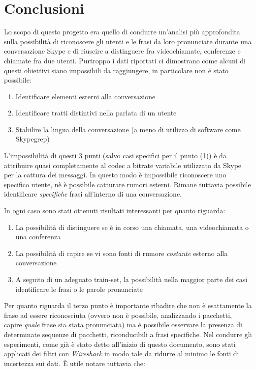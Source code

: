 \chapter{Conclusioni}

Lo scopo di questo progetto era quello di condurre un'analisi più approfondita sulla possibilità di riconoscere gli utenti e le frasi da loro pronunciate durante una conversazione Skype e di riuscire a distinguere fra videochiamate, conferenze e chiamate fra due utenti.\newline
Purtroppo i dati riportati ci dimostrano come alcuni di questi obiettivi siano impossibili da raggiungere, in particolare non è stato possibile:

\begin{enumerate}
\item Identificare elementi esterni alla conversazione
\item Identificare tratti distintivi nella parlata di un utente
\item Stabilire la lingua della conversazione (a meno di utilizzo di software come Skypegrep)
\end{enumerate}

L'impossibilità di questi 3 punti (salvo casi specifici per il punto (1)) è da attribuire quasi completamente al codec a bitrate variabile utilizzato da Skype per la cattura dei messaggi. In questo modo è impossibile riconoscere uno specifico utente, nè è possibile catturare rumori esterni. Rimane tuttavia possibile identificare \emph{specifiche} frasi all'interno di una conversazione.\newline\newline

In ogni caso sono stati ottenuti risultati interessanti per quanto riguarda:

\begin{enumerate}
\item La possibilità di distinguere se è in corso una chiamata, una videochiamata o una conferenza
\item La possibilità di capire se vi sono fonti di rumore \emph{costante} esterno alla conversazione
\item A seguito di un adeguato train-set, la possibilità nella maggior parte dei casi identificare le frasi o le parole pronunciate
\end{enumerate}

Per quanto riguarda il terzo punto è importante ribadire che non è esattamente la frase ad essere riconosciuta (ovvero non è possibile, analizzando i pacchetti, capire \emph{quale} frase sia stata pronunciata) ma è possibile osservare la presenza di determinate sequenze di pacchetti, riconducibili a frasi specifiche.\newline\newline
Nel condurre gli esperimenti, come già è stato detto all'inizio di questo documento, sono stati applicati dei filtri con \textsl{Wireshark} in modo tale da ridurre al minimo le fonti di incertezza sui dati. È utile notare tuttavia che:


